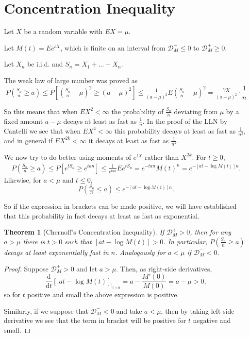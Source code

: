 \documentclass[12pt]{article}
\newtheorem{theorem}[equation]{Theorem}
\theoremstyle{definition}
\newcommand{\dd}{\mathrm{d}}
\newcommand{\D}{\mathcal{D}}
\newcommand{\E}{\mathbb{E}}
\renewcommand{\P}{\mathbb{P}}
\newcommand{\V}{\mathbb{V}}
\renewcommand{\ge}{\geqslant}
\renewcommand{\le}{\leqslant}
\renewcommand{\t}{t}
\renewcommand{\E}{E}
\renewcommand{\P}{P}
\renewcommand{\V}{V}
\begin{document}
\section{Concentration Inequality}

Let $X$ be a random variable with $\E X=\mu$.

Let $M(\t)=\E e^{\t X}$, which is finite on an interval from $\D_M^- \le 0$ to $\D_M^+ \ge 0$.

Let $X_n$ be i.i.d. and $S_n=X_1 + \dots + X_n$.

The weak law of large number was proved as
\[
\P\left( \tfrac{S_n}{n} \ge a \right)
\le
\P\left[ (\tfrac{S_n}{n}-\mu)^2 \ge (a-\mu)^2 \right]
\le
\tfrac{1}{(a-\mu)^2} \E\left( \tfrac{S_n}{n}-\mu \right)^2
=
\tfrac{\V X}{(a-\mu)^{2}} \cdot \frac{1}{n}
\]

So this means that when $EX^2<\infty$ the probability of $\tfrac{S_n}{n}$ deviating from $\mu$ by a fixed amount $a-\mu$ decays at least as fast as $\frac{1}{n}$.
In the proof of the LLN by Cantelli we see that when $\E X^4<\infty$ this probability decays at least as fast as $\frac{1}{n^2}$, and in general if $\E X^{2k}<\infty$ it decays at least as fast as $\frac{1}{n^k}$.

We now try to do better using moments of $e^{\t X}$ rather than $X^{2k}$.
For $\t \ge 0$,
\begin{multline}
\nonumber
\P\left( \tfrac{S_n}{n} \ge a \right)
\le
\P\left[ e^{\t S_n} \ge e^{\t a n} \right]
\le
\tfrac{1}{e^{\t a n}} \E e^{\t S_n}
=
{e^{- \t a n}} M(\t)^n
=
{e^{- [a \t -\log M(\t)] n}}
.
\end{multline}
Likewise, for $a < \mu$ and $\t \le 0$,
\begin{equation}
\label{eq:decay}
\P\left( \tfrac{S_n}{n} \le a \right)
\le
{e^{- [a \t -\log M(\t)] n}}
.
\end{equation}

So if the expression in brackets can be made positive, we will have established that this probability in fact decays at least as fast as exponential.

\begin{theorem}
[Chernoff's Concentration Inequality]
\label{thm:chernoff}
If $\D_M^+>0$, then for any $a > \mu$ there is $\t>0$ such that $[a\t-\log M(\t)]>0$.
In particular, $\P\left( \tfrac{S_n}{n} \ge a \right)$ decays at least exponentially fast in $n$.
Analogously for $a < \mu$ if $\D_M^-<0$.
\end{theorem}
\begin{proof}
Suppose $\D_M^+>0$ and let $a>\mu$. Then, as right-side derivatives,
\[
\frac{\dd}{\dd \t}\left[ \Big. a\t -\log M(\t) \right]_{\big|_{\t=0}}
=
a - \frac{M'(0)}{M(0)}
=
a-\mu>0
,
\]
so for $\t$ positive and small the above expression is positive.

Similarly, if we suppose that $\D_M^-<0$ and take $a<\mu$, then by taking left-side derivative we see that the term in bracket will be positive for $\t$ negative and small.
\end{proof}
\end{document}
